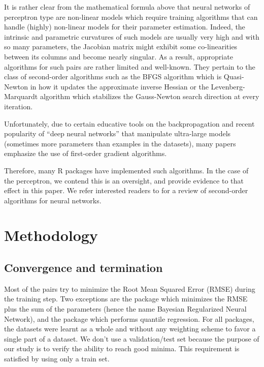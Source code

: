 It is rather clear from the mathematical formula above that neural
networks of perceptron type are non-linear models which require training
algorithms that can handle (highly) non-linear models for their
parameter estimation. Indeed, the intrinsic and parametric curvatures of
such models are usually very high and with so many parameters, the
Jacobian matrix might exhibit some co-linearities between its columns
and become nearly singular. As a result, appropriate algorithms for such
 pairs are rather limited and well-known. They
pertain to the class of second-order algorithms such as the BFGS
algorithm which is Quasi-Newton in how it updates the approximate
inverse Hessian or the Levenberg-Marquardt algorithm which stabilizes
the Gauss-Newton search direction at every iteration.

Unfortunately, due to certain educative tools on the backpropagation and
recent popularity of ``deep neural networks'' that manipulate
ultra-large models (sometimes more parameters than examples in the
datasets), many papers emphasize the use of first-order gradient
algorithms.

Therefore, many R packages have implemented such algorithms. In the case
of the perceptron, we contend this is an oversight, and provide evidence
to that effect in this paper. We refer interested readers to
\citep{tan2019review} for a review of second-order algorithms for neural
networks.

\hypertarget{methodology}{%
\section{Methodology}\label{methodology}}

\hypertarget{convergence-and-termination}{%
\subsection{Convergence and
termination}\label{convergence-and-termination}}

Most of the  pairs try to minimize the Root Mean
Squared Error (RMSE) during the training step. Two exceptions are the
 package which minimizes the RMSE plus the sum of the
parameters (hence the name Bayesian Regularized Neural Network), and the
 package which performs quantile regression. For all
packages, the datasets were learnt as a whole and without any weighting
scheme to favor a single part of a dataset. We don't use a
validation/test set because the purpose of our study is to verify the
ability to reach good minima. This requirement is satisfied by using
only a train set.

